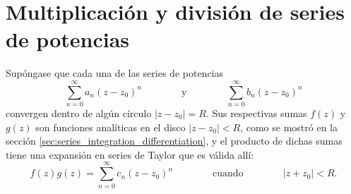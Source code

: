 \documentclass[a4paper]{report}
\begin{document}
\section{Multiplicación y división de series de potencias}\label{sec:series_multiplication_division}

Supóngase que cada una de las series de potencias
\begin{equation}\label{eq:power_series_generic_definition_two}
 \sum_{n=0}^\infty a_n(z-z_0)^n
 \qquad\qquad\textrm{y}\qquad\qquad
 \sum_{n=0}^\infty b_n(z-z_0)^n 
\end{equation}
convergen dentro de algún círculo \(|z-z_0|=R\). Sus respectivas sumas \(f(z)\) y \(g(z)\) son funciones analíticas en el disco \(|z-z_0|<R\), como se mostró en la sección \ref{sec:series_integration_differentiation}, y el producto de dichas sumas tiene una expansión en series de Taylor que es válida allí:
\begin{equation}\label{eq:power_series_product_tmp}
 f(z)g(z)=\sum_{n=0}^\infty c_n(z-z_0)^n
 \qquad\qquad\textrm{cuando}\qquad\qquad
 |z+z_0|<R. 
\end{equation}
\end{document}
